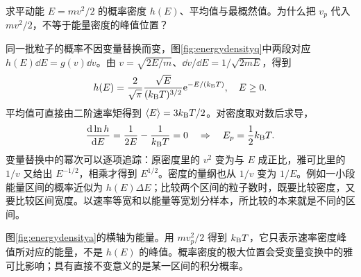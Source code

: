 \begin{example}[能量密度的最概然值]
求平动能 $E=mv^2/2$ 的概率密度 $h(E)$、平均值与最概然值。为什么把 $v_p$ 代入 $mv^2/2$，不等于能量密度的峰值位置？
\end{example}
\begin{solution}
同一批粒子的概率不因变量替换而变，图\ref{fig:energydensityq}中两段对应 $h(E)\dd E=g(v)\dd v$。由 $v=\sqrt{2E/m}$、$\dd v/\dd E=1/\sqrt{2mE}$，得到
\[
 h(E)=\frac2{\sqrt\pi}\frac{\sqrt E}{(k_{\mathrm B} T)^{3/2}}\mathrm e^{-E/(k_{\mathrm B} T)},\quad E\ge0.
\]
平均值可直接由二阶速率矩得到 $\langle E\rangle=3k_{\mathrm B} T/2$。对密度取对数后求导，
\[
 \frac{\mathop{}\!\mathrm d\ln h}{\mathop{}\!\mathrm d E}=\frac1{2E}-\frac1{k_{\mathrm B} T}=0
 \quad\Rightarrow\quad E_p=\frac12k_{\mathrm B} T.
\]
变量替换中的幂次可以逐项追踪：原密度里的 $v^2$ 变为与 $E$ 成正比，雅可比里的 $1/v$ 又给出 $E^{-1/2}$，相乘才得到 $E^{1/2}$。密度的量纲也从 $1/v$ 变为 $1/E$。例如一小段能量区间的概率近似为 $h(E)\Delta E$；比较两个区间的粒子数时，既要比较密度，又要比较区间宽度。以速率等宽和以能量等宽划分样本，所比较的本来就是不同的区间。

图\ref{fig:energydensitya}的横轴为能量。用 $mv_p^2/2$ 得到 $k_{\mathrm B} T$，它只表示速率密度峰值所对应的能量，不是 $h(E)$ 的峰值。概率密度的极大位置会受变量变换中的雅可比影响；具有直接不变意义的是某一区间的积分概率。
\end{solution}


